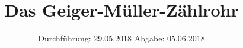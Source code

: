 

\subject{Versuch 703}
\title{Das Geiger-Müller-Zählrohr}
\date{%
  Durchführung: 29.05.2018
  \hspace{3em}
  Abgabe: 05.06.2018
}



\maketitle
\thispagestyle{empty}
\tableofcontents
\newpage






\printbibliography{}


